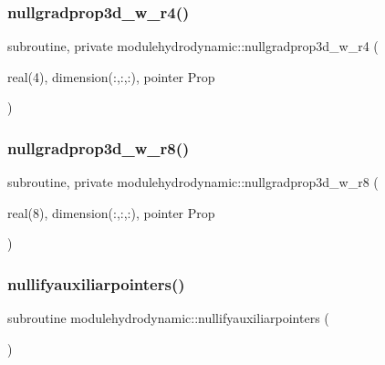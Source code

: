 \subsubsection{\texorpdfstring{nullgradprop3d\+\_\+w\+\_\+r4()}{nullgradprop3d\_w\_r4()}}
{\footnotesize\ttfamily subroutine, private modulehydrodynamic\+::nullgradprop3d\+\_\+w\+\_\+r4 (\begin{DoxyParamCaption}\item[{real(4), dimension(\+:,\+:,\+:), pointer}]{Prop }\end{DoxyParamCaption})\hspace{0.3cm}{\ttfamily [private]}}

\mbox{\label{namespacemodulehydrodynamic_a13ad3cb0f06fa1566caea1eedccae55a}} 
\subsubsection{\texorpdfstring{nullgradprop3d\+\_\+w\+\_\+r8()}{nullgradprop3d\_w\_r8()}}
{\footnotesize\ttfamily subroutine, private modulehydrodynamic\+::nullgradprop3d\+\_\+w\+\_\+r8 (\begin{DoxyParamCaption}\item[{real(8), dimension(\+:,\+:,\+:), pointer}]{Prop }\end{DoxyParamCaption})\hspace{0.3cm}{\ttfamily [private]}}

\mbox{\label{namespacemodulehydrodynamic_a43c5994c86b411881eec077d6376cb07}} 
\subsubsection{\texorpdfstring{nullifyauxiliarpointers()}{nullifyauxiliarpointers()}}
{\footnotesize\ttfamily subroutine modulehydrodynamic\+::nullifyauxiliarpointers (\begin{DoxyParamCaption}{ }\end{DoxyParamCaption})\hspace{0.3cm}{\ttfamily [private]}}

